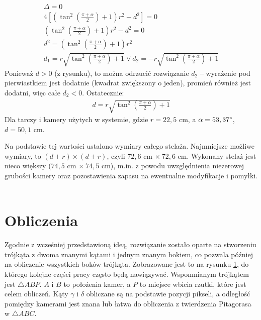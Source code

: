 \begin{gather*}
\Delta = 0 \\
4[(\tan^2(\frac{\pi + \alpha}{2}) + 1)r^2 - d^2] = 0 \\
(\tan^2(\frac{\pi + \alpha}{2}) + 1)r^2 - d^2 = 0 \\
d^2 = (\tan^2(\frac{\pi + \alpha}{2}) + 1)r^2 \\
d_1 = r\sqrt{\tan^2(\frac{\pi + \alpha}{2}) + 1} \lor d_2 = - r\sqrt{\tan^2(\frac{\pi + \alpha}{2}) + 1}
\end{gather*}
Ponieważ $d > 0$ (z rysunku), to można odrzucić rozwiązanie $d_2$ -- wyrażenie pod pierwiastkiem jest dodatnie (kwadrat zwiększony o jeden), promień również jest dodatni, więc całe $d_2 < 0$. Ostatecznie:
\begin{gather*}
d = r\sqrt{\tan^2(\frac{\pi + \alpha}{2}) + 1}
\end{gather*}
Dla tarczy i kamery użytych w systemie, gdzie $r = 22,5$ cm, a $\alpha = 53,37\degree$, $d = 50,1$ cm.

Na podstawie tej wartości ustalono wymiary całego stelaża. Najmniejsze możliwe wymiary, to $(d + r) \times (d + r)$, czyli $72,6$ cm $\times \ 72,6$ cm. Wykonany stelaż jest nieco większy ($74,5$ cm $\times \ 74,5$ cm), m.in. z powodu uwzględnienia niezerowej grubości kamery oraz pozostawienia zapasu na ewentualne modyfikacje i pomyłki.

\begin{gather*}
\end{gather*}

\section{Obliczenia}
Zgodnie z wcześniej przedstawioną ideą, rozwiązanie zostało oparte na stworzeniu trójkąta z dwoma znanymi kątami i jednym znanym bokiem, co pozwala później na obliczenie wszystkich boków trójkąta. Zobrazowane jest to na rysunku \ref{stelaz_trojkat}, do którego kolejne części pracy często będą nawiązywać. Wspomnianym trójkątem jest $\triangle ABP$. $A$ i $B$ to położenia kamer, a $P$ to miejsce wbicia rzutki, które jest celem obliczeń. Kąty $\gamma$ i $\delta$ obliczane są na podstawie pozycji pikseli, a odległość pomiędzy kamerami jest znana lub łatwa do obliczenia z twierdzenia Pitagorasa w $\triangle ABC$.

\begin{figure}[h!]
\begin{center}

\end{center}
\label{stelaz_trojkat}
\end{figure} 

